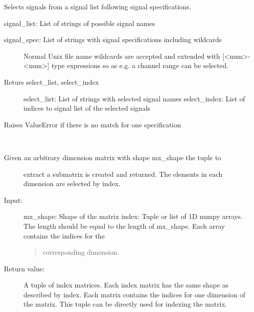 \documentclass[letterpaper,10pt,english]{sphinxmanual}
\begin{document}

\begin{fulllineitems}
\label{\detokenize{tools:flap.tools.select_signals}}
Selects signals from a signal list following signal specifications.

signal\_list: List of strings of possible signal names
\begin{description}
\item[{signal\_spec: List of strings with signal specifications including wildcards}] \leavevmode
Normal Unix file name wildcards are accepted and extended with
{[}\textless{}num\textgreater{}-\textless{}num\textgreater{}{]} type expressions so as e.g. a channel range can be selected.

\item[{Returs select\_list, select\_index}] \leavevmode
select\_list: List of strings with selected signal names
select\_index: List of indices to signal list of the selected signals

\end{description}

Raises ValueError if there is no match for one specification

\end{fulllineitems}


\begin{fulllineitems}
\label{\detokenize{tools:flap.tools.submatrix_index}}~\begin{description}
\item[{Given an arbitrary dimension matrix with shape mx\_shape the tuple to}] \leavevmode
extract a submatrix is created and returned.
The elements in each dimension are selected by index.

\item[{Input:}] \leavevmode
mx\_shape: Shape of the matrix
index: Tuple or list of 1D numpy arrays. The length should be equal to the
length of mx\_shape. Each array contains the indices for the
\begin{quote}

corresponding dimension.
\end{quote}

\item[{Return value:}] \leavevmode
A tuple of index matrices. Each index matrix has the same shape as
described by index. Each matrix contains the indices for one dimension
of the matrix. This tuple can be directly used for indexing the matrix.

\end{description}

\end{fulllineitems}
\end{document}
